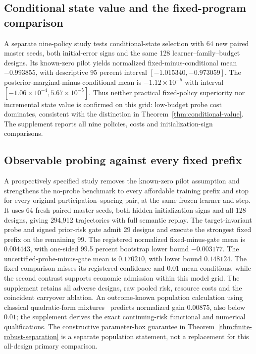 \documentclass[journal]{IEEEtran}
\begin{document}
\subsection{Conditional state value and the fixed-program comparison}
A separate nine-policy study tests conditional-state selection with 64 new paired master seeds, both initial-error signs and the same 128 learner--family--budget designs.
Its known-zero pilot yields normalized fixed-minus-conditional mean $-0.993855$, with descriptive 95 percent interval $[-1.015340,-0.973059]$.
The posterior-marginal-minus-conditional mean is $-1.12\times10^{-5}$ with interval $[-1.06\times10^{-4},5.67\times10^{-5}]$.
Thus neither practical fixed-policy superiority nor incremental state value is confirmed on this grid: low-budget probe cost dominates, consistent with the distinction in Theorem~\ref{thm:conditional-value}.
The supplement reports all nine policies, costs and initialization-sign comparisons.

\subsection{Observable probing against every fixed prefix}
A prospectively specified study removes the known-zero pilot assumption and strengthens the no-probe benchmark to every affordable training prefix and stop for every original participation--spacing pair, at the same frozen learner and step.
It uses 64 fresh paired master seeds, both hidden initialization signs and all 128 designs, giving 294,912 trajectories with full semantic replay.
The target-invariant probe and signed prior-risk gate admit 29 designs and execute the strongest fixed prefix on the remaining 99.
The registered normalized fixed-minus-gate mean is $0.004443$, with one-sided 99.5 percent bootstrap lower bound $-0.003177$.
The uncertified-probe-minus-gate mean is $0.170210$, with lower bound $0.148124$.
The fixed comparison misses its registered confidence and $0.01$ mean conditions, while the second contrast supports economic admission within this model grid.
The supplement retains all adverse designs, raw pooled risk, resource costs and the coincident carryover ablation.
An outcome-known population calculation using classical quadratic-form mixtures~\cite{solomon1961quadratic} predicts normalized gain $0.00875$, also below $0.01$; the supplement derives the exact continuing-risk functional and numerical qualifications.
The constructive parameter-box guarantee in Theorem~\ref{thm:finite-robust-separation} is a separate population statement, not a replacement for this all-design primary comparison.
\end{document}
